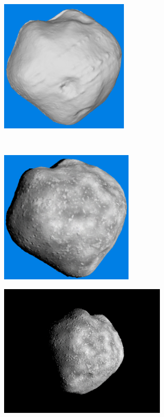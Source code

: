 \begin{figure}[htb]
\begin{subfigure}[b]{0.4\textwidth}
        \caption{}
        \label{fig:recon_step_mesh}
    \end{subfigure}
    \begin{subfigure}[b]{0.4\textwidth}
        \centering
        \includegraphics[width=\textwidth,height=6.4cm]{doc/thesis/0_figures/models_quality/100_1/120_100_1_refine2.png}
        \caption{}
        \label{fig:recon_step_refine}
    \end{subfigure}
    \\
    \begin{subfigure}[b]{0.4\textwidth}
        \centering
        \includegraphics[width=\textwidth,height=6.4cm]{doc/thesis/0_figures/models_quality/100_1/120_100_1_texture1.png}
        \caption{}
        \label{fig:recon_step_texture}
    \end{subfigure}
    \begin{subfigure}[b]{0.4\textwidth}
        \centering
        \includegraphics[width=\textwidth,height=6.4cm]{doc/thesis/0_figures/models_quality/100_1/120_100_1_img1.png}

\end{subfigure}
\end{figure}
